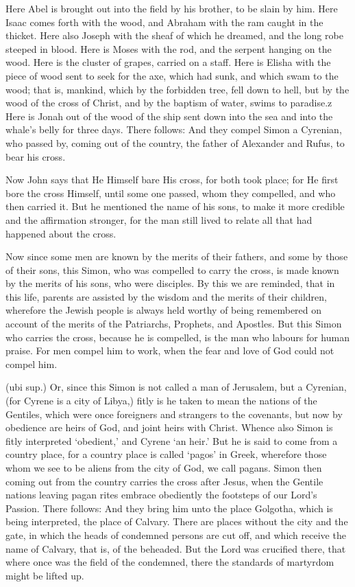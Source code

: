 Here Abel is brought out into the field by his brother, to be slain by him. Here Isaac comes forth with the wood, and Abraham with the ram caught in the thicket. Here also Joseph with the sheaf of which he dreamed, and the long robe steeped in blood. Here is Moses with the rod, and the serpent hanging on the wood. Here is the cluster of grapes, carried on a staff. Here is Elisha with the piece of wood sent to seek for the axe, which had sunk, and which swam to the wood; that is, mankind, which by the forbidden tree, fell down to hell, but by the wood of the cross of Christ, and by the baptism of water, swims to paradise.z Here is Jonah out of the wood of the ship sent down into the sea and into the whale’s belly for three days. There follows: And they compel Simon a Cyrenian, who passed by, coming out of the country, the father of Alexander and Rufus, to bear his cross.

 Now John says that He Himself bare His cross, for both took place; for He first bore the cross Himself, until some one passed, whom they compelled, and who then carried it. But he mentioned the name of his sons, to make it more credible and the affirmation stronger, for the man still lived to relate all that had happened about the cross.

 Now since some men are known by the merits of their fathers, and some by those of their sons, this Simon, who was compelled to carry the cross, is made known by the merits of his sons, who were disciples. By this we are reminded, that in this life, parents are assisted by the wisdom and the merits of their children, wherefore the Jewish people is always held worthy of being remembered on account of the merits of the Patriarchs, Prophets, and Apostles. But this Simon who carries the cross, because he is compelled, is the man who labours for human praise. For men compel him to work, when the fear and love of God could not compel him.

 (ubi sup.) Or, since this Simon is not called a man of Jerusalem, but a Cyrenian, (for Cyrene is a city of Libya,) fitly is he taken to mean the nations of the Gentiles, which were once foreigners and strangers to the covenants, but now by obedience are heirs of God, and joint heirs with Christ. Whence also Simon is fitly interpreted ‘obedient,’ and Cyrene ‘an heir.’ But he is said to come from a country place, for a country place is called ‘pagos’ in Greek, wherefore those whom we see to be aliens from the city of God, we call pagans. Simon then coming out from the country carries the cross after Jesus, when the Gentile nations leaving pagan rites embrace obediently the footsteps of our Lord’s Passion. There follows: And they bring him unto the place Golgotha, which is being interpreted, the place of Calvary. There are places without the city and the gate, in which the heads of condemned persons are cut off, and which receive the name of Calvary, that is, of the beheaded. But the Lord was crucified there, that where once was the field of the condemned, there the standards of martyrdom might be lifted up.

